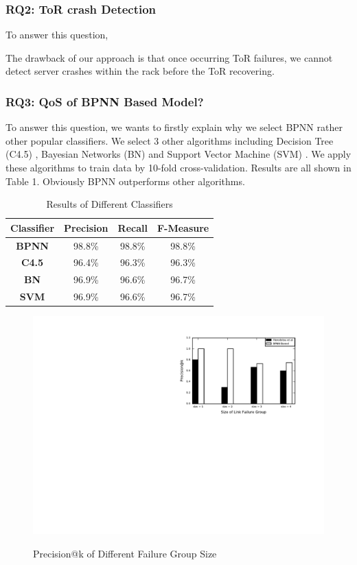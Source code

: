 \documentclass{sig-alternate-05-2015}
\begin{document}
\subsubsection*{RQ2: ToR crash Detection}
\quad To answer this question, 

The drawback of our approach is that once occurring ToR failures, we cannot detect server crashes within the rack before the ToR recovering.

\subsubsection*{RQ3: QoS of BPNN Based Model?}
\quad To answer this question, we wants to firstly explain why we select BPNN rather other popular classifiers. We select 3 other algorithms including Decision Tree (C4.5) \cite{quinlan2014c4}, Bayesian Networks (BN) \cite{jensen1996introduction} and Support Vector Machine (SVM) \cite{scholkopf1999advances}. We apply these algorithms to train data by 10-fold cross-validation. Results are all shown in Table 1. Obviously BPNN outperforms other algorithms.

\begin{table}
    \centering
    \caption{Results of Different Classifiers}
    \begin{tabular}{|c|c|c|c|} \hline
        \textbf{Classifier} & \textbf{Precision} & \textbf{Recall} & \textbf{F-Measure} \\ \hline
        \hline
        \textbf{BPNN} & 98.8\% & 98.8\% & 98.8\% \\ \hline
        \textbf{C4.5} & 96.4\% & 96.3\% & 96.3\% \\ \hline
        \textbf{BN} & 96.9\% & 96.6\% & 96.7\% \\ \hline
        \textbf{SVM} & 96.9\% & 96.6\% & 96.7\% \\ \hline
    \end{tabular}
\end{table}

\begin{figure}
  \centering
  \includegraphics[scale=0.7]{precision} \\
  \caption{Precision@k of Different Failure Group Size}
\end{figure}
\end{document}
